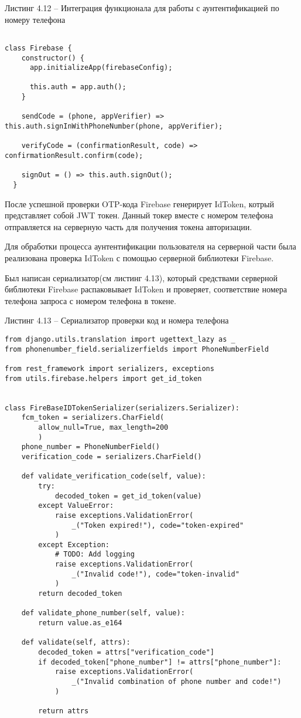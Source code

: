 Листинг 4.12 – Интеграция функционала для работы с аунтентификацией по номеру телефона
\begin{lstlisting}

class Firebase {
    constructor() {
      app.initializeApp(firebaseConfig);

      this.auth = app.auth();
    }

    sendCode = (phone, appVerifier) => this.auth.signInWithPhoneNumber(phone, appVerifier);

    verifyCode = (confirmationResult, code) => confirmationResult.confirm(code);

    signOut = () => this.auth.signOut();
  }

\end{lstlisting}

После успешной проверки OTP-кода Firebase генерирует IdToken, котрый представляет собой JWT токен.
Данный токер вместе с номером телефона отправляется на серверную часть для получения токена авторизации.

Для обработки процесса аунтентификации пользователя на серверной части была реализована проверка IdToken с помощью серверной библиотеки Firebase.


Был написан сериализатор(см листинг 4.13), который средствами серверной библиотеки Firebase распаковывает IdToken и проверяет, соответствие номера телефона запроса с номером телефона в токене.

Листинг 4.13 – Сериализатор проверки код и номера телефона
\begin{lstlisting}
from django.utils.translation import ugettext_lazy as _
from phonenumber_field.serializerfields import PhoneNumberField

from rest_framework import serializers, exceptions
from utils.firebase.helpers import get_id_token


class FireBaseIDTokenSerializer(serializers.Serializer):
    fcm_token = serializers.CharField(
        allow_null=True, max_length=200
        )
    phone_number = PhoneNumberField()
    verification_code = serializers.CharField()

    def validate_verification_code(self, value):
        try:
            decoded_token = get_id_token(value)
        except ValueError:
            raise exceptions.ValidationError(
                _("Token expired!"), code="token-expired"
            )
        except Exception:
            # TODO: Add logging
            raise exceptions.ValidationError(
                _("Invalid code!"), code="token-invalid"
            )
        return decoded_token

    def validate_phone_number(self, value):
        return value.as_e164

    def validate(self, attrs):
        decoded_token = attrs["verification_code"]
        if decoded_token["phone_number"] != attrs["phone_number"]:
            raise exceptions.ValidationError(
                _("Invalid combination of phone number and code!")
            )

        return attrs

\end{lstlisting}

